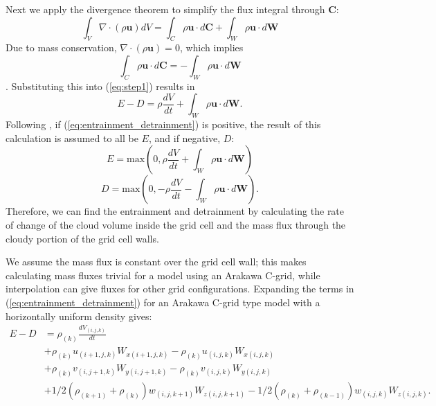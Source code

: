\documentclass[12pt]{article}
\begin{document}
Next we apply the divergence theorem to simplify the flux integral through 
$\mathbf{C}$:
\begin{equation}
\label{eq:divergence} 
\int_{V} \nabla \cdot (\rho \mathbf{u}) dV = 
  \int_{C} \rho \mathbf{u}\cdot d\mathbf{C}
+ \int_{W} \rho \mathbf{u}\cdot d\mathbf{W}
\end{equation}
Due to mass conservation, $\nabla \cdot (\rho \mathbf{u}) = 0$, which implies
\begin{equation}
\label{eq:divergence3} 
  \int_{C} \rho \mathbf{u}\cdot d\mathbf{C} = 
    - \int_{W} \rho \mathbf{u}\cdot d\mathbf{W}
\end{equation}.
Substituting this into (\ref{eq:step1}) results in
\begin{equation}
\label{eq:entrainment_detrainment} 
E - D = \rho \frac{dV}{dt} + \int_W \rho \mathbf{u} \cdot d\mathbf{W}.
\end{equation}
Following \cite{Romps2010}, if (\ref{eq:entrainment_detrainment}) is positive,
the result of this calculation is assumed to all be $E$, and if negative, $D$:  
\begin{equation}
\label{eq:max_ent} 
E = \mathrm{max}\left(0, 
    \rho \frac{dV}{dt} + \int_W \rho \mathbf{u} \cdot d\mathbf{W}\right)
\end{equation}
\begin{equation}
\label{eq:max_det} 
D = \mathrm{max}\left(0, 
  - \rho \frac{dV}{dt} - \int_W \rho \mathbf{u} \cdot d\mathbf{W}\right).
\end{equation}
Therefore, we can find the entrainment and detrainment by calculating the rate 
of change of the cloud volume inside the grid cell and the mass flux through 
the cloudy portion of the grid cell walls.

We assume the mass flux is constant over the grid cell wall; this makes 
calculating mass fluxes trivial for a model using an Arakawa C-grid, while 
interpolation can give fluxes for other grid configurations.  Expanding the 
terms in (\ref{eq:entrainment_detrainment}) for an Arakawa C-grid type model
with a horizontally uniform density gives:
\begin{equation}
\label{eq:explicit_term_expansion}
\begin{split}
E - D & = \rho_{(k)} \frac{dV_{(i, j, k)}}{dt} \\
      & + \rho_{(k)} u_{(i+1,j,k)} W_{x(i+1, j, k)} 
        - \rho_{(k)} u_{(i,j,k)} W_{x(i, j, k)} \\
      & + \rho_{(k)} v_{(i,j+1,k)} W_{y(i, j+1, k)} 
        - \rho_{(k)} v_{(i,j,k)} W_{y(i, j, k)} \\
      & + 1/2 (\rho_{(k+1)} + \rho_{(k)}) w_{(i,j,k+1)} W_{z(i, j, k+1)} 
        - 1/2 (\rho_{(k)} + \rho_{(k-1)}) w_{(i,j,k)} W_{z(i, j, k)}.
\end{split}
\end{equation}
\end{document}
